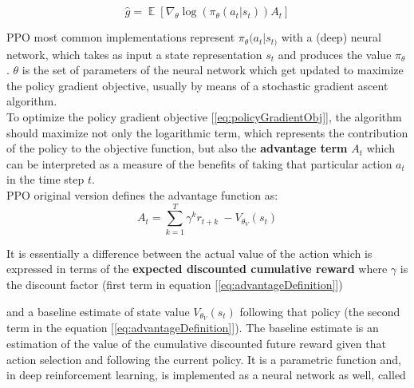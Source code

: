 \documentclass{article}
\DeclareMathOperator{\EX}{\mathbb{E}}%
\begin{document}
\begin{equation}\label{eq:policyGradientObj}
\hat{g} = \EX[\nabla_{\theta}\log(\pi_{\theta}(a_{t}|s_{t}))A_{t}]
\end{equation}

PPO most common implementations represent \(\pi_{\theta}(a_{t}|s_{t)}\) with a (deep) neural network, which takes as input a state representation \(s_{t}\) and produces the value \(\pi_{\theta}\). \(\theta\) is the set of parameters of the neural network which get updated to maximize the policy gradient objective, usually by means of a stochastic gradient ascent algorithm.\\
To optimize the policy gradient objective [\ref{eq:policyGradientObj}], the algorithm should maximize not only the logarithmic term, which represents the contribution of the policy to the objective function, but also the \textbf{advantage term} \(A_{t}\) which can be interpreted as a measure of the benefits of taking that particular action \(a_{t}\) in the time step \(t\). \\
PPO original version defines the advantage function as:
\begin{equation}\label{eq:advantageDefinition}
A_{t}= \sum_{k=1}^{T}\gamma^{k}r_{t+k} \: - V_{\theta_{V}}(s_{t})
\end{equation}

\noindent
It is essentially a difference between the actual value of the action which is expressed in terms of the \textbf{expected discounted cumulative reward} where \(\gamma\) is the discount factor (first term in equation [\ref{eq:advantageDefinition}])

and a baseline estimate of state value \(V_{\theta_{V}}(s_{t})\) following that policy (the second term in the equation [\ref{eq:advantageDefinition}]). The baseline estimate is an estimation of the value of the cumulative discounted future reward given that action selection and following the current policy. It is a parametric function and, in deep reinforcement learning, is implemented as a neural network as well, called

\end{document}
